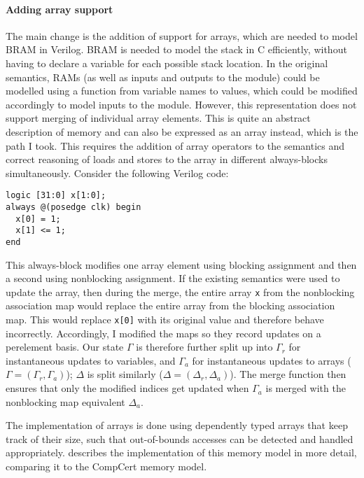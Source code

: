 \paragraph{Adding array support}
The main change is the addition of support for arrays, which are needed to model
\gls{BRAM} in Verilog.  \gls{BRAM} is needed to model the stack in C
efficiently, without having to declare a variable for each possible stack
location.  In the original semantics, RAMs (as well as inputs and outputs to the
module) could be modelled using a function from variable names to values, which
could be modified accordingly to model inputs to the module.  However, this
representation does not support merging of individual array elements.  This is
quite an abstract description of memory and can also be expressed as an array
instead, which is the path I took.  This requires the addition of array
operators to the semantics and correct reasoning of loads and stores to the
array in different always-blocks simultaneously.  Consider the following Verilog
code:
%
  \begin{center}
\begin{verbatim}
logic [31:0] x[1:0];
always @(posedge clk) begin
  x[0] = 1;
  x[1] <= 1;
end
\end{verbatim}
  \end{center}
%
This always-block modifies one array element using blocking assignment and then
a second using nonblocking assignment.  If the existing semantics were used to
update the array, then during the merge, the entire array \texttt{x} from the
nonblocking association map would replace the entire array from the blocking
association map.  This would replace \texttt{x[0]} with its original value and
therefore behave incorrectly. Accordingly, I modified the maps so they record
updates on a per\?element basis. Our state $\Gamma$ is therefore further split
up into $\Gamma_{r}$ for instantaneous updates to variables, and $\Gamma_{a}$
for instantaneous updates to arrays ($\Gamma = (\Gamma_{r}, \Gamma_{a})$);
$\Delta$ is split similarly ($\Delta = (\Delta_{r}, \Delta_{a})$). The merge
function then ensures that only the modified indices get updated when
$\Gamma_{a}$ is merged with the nonblocking map equivalent $\Delta_{a}$.

The implementation of arrays is done using dependently typed arrays that keep
track of their size, such that out-of-bounds accesses can be detected and
handled appropriately.   describes the implementation
of this memory model in more detail, comparing it to the CompCert memory model.

